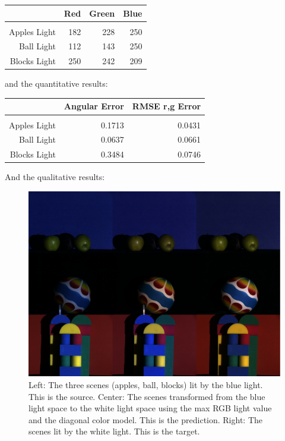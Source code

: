\documentclass{article}
\begin{document}
\begin{tabular}{r | r r r}
                 & Red & Green & Blue \\
    \hline                            \\
    Apples Light & 182 &   228 &  250 \\
      Ball Light & 112 &   143 &  250 \\
    Blocks Light & 250 &   242 &  209
\end{tabular}

and the quantitative results:

\begin{tabular}{r | r r}
                 & Angular Error & RMSE r,g Error \\
    \hline                                        \\
    Apples Light &        0.1713 &         0.0431 \\
      Ball Light &        0.0637 &         0.0661 \\
    Blocks Light &        0.3484 &         0.0746
\end{tabular}

And the qualitative results:

\begin{figure}[!ht]
	\centering
	\includegraphics[width=120mm]{figs/results-maxrgb-3x3.png}
	\caption{Left: The three scenes (apples, ball, blocks) lit by the blue light. This is the source. 
        Center: The scenes transformed from the blue light space to the white light space 
        using the max RGB light value and the diagonal color model. 
        This is the prediction.
        Right: The scenes lit by the white light. This is the target.}
\end{figure}
\end{document}
